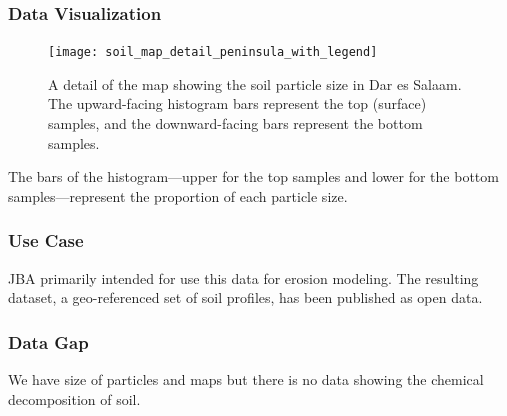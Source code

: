 \documentclass[a4paper,12pt,twoside]{article}
\begin{document}
\subsubsection{Data Visualization}
\begin{figure}[h]
  \caption{A detail of the map showing the soil particle size in Dar es Salaam. The upward-facing histogram bars represent the top (surface) samples, and the downward-facing bars represent the bottom samples.}
  \centering
  \texttt{[image: soil\_map\_detail\_peninsula\_with\_legend]}
\end{figure}
The bars of the histogram—upper for the top samples and lower for the bottom samples—represent the proportion of each particle size.

\subsubsection{Use Case}
JBA  primarily intended for use this data for erosion modeling. The resulting dataset, a geo-referenced set of soil profiles, has been published as open data.

\subsubsection{Data Gap}
We have size of particles and maps but there is no data showing the chemical decomposition of soil.
\end{document}
